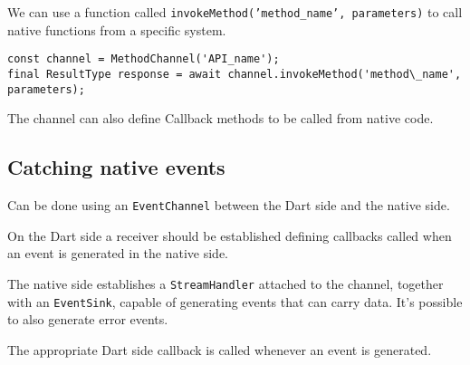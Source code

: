 We can use a function called \texttt{invokeMethod('method\_name', parameters)} to 
call native functions from a specific system. 

\begin{lstlisting}
const channel = MethodChannel('API_name');
final ResultType response = await channel.invokeMethod('method\_name', parameters);
\end{lstlisting}

The channel can also define Callback methods to be called from native code.

\subsection{Catching native events}
Can be done using an \texttt{EventChannel} between the Dart side and the native side.

On the Dart side a receiver should be established defining callbacks called when an
event is generated in the native side.

The native side establishes a \texttt{StreamHandler} attached to the channel, together with an
\texttt{EventSink}, capable of generating events that can carry data. It's possible to also
generate error events.

The appropriate Dart side callback is called whenever an event is generated.

